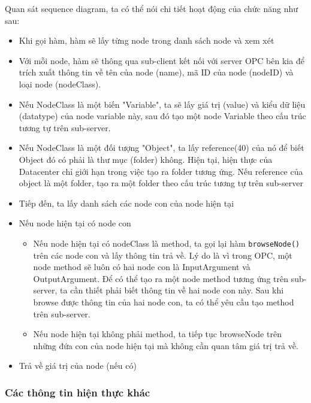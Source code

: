 Quan sát sequence diagram, ta có thể nói chi tiết hoạt động của chức năng như sau:
\begin{itemize}
    \item Khi gọi hàm, hàm sẽ lấy từng node trong danh sách node và xem xét
    \item Với mỗi node, hàm sẽ thông qua sub-client kết nối với server OPC bên kia để trích xuất thông tin về tên của node (name), mã ID của node (nodeID) và loại node (nodeClass).
    \item Nếu NodeClass là một biến "Variable", ta sẽ lấy giá trị (value) và kiểu dữ liệu (datatype) của node variable này, sau đó tạo một node Variable theo cấu trúc tương tự trên sub-server.
    \item Nếu NodeClass là một đối tượng "Object", ta lấy reference(40) của nó để biết Object đó có phải là thư mục (folder) không. Hiện tại, hiện thực của Datacenter chỉ giới hạn trong việc tạo ra folder tương ứng. Nếu reference của object là một folder, tạo ra một folder theo cấu trúc tương tự trên sub-server
    \item Tiếp đến, ta lấy danh sách các node con của node hiện tại
    \item Nếu node hiện tại có node con
    \begin{itemize}
        \item Nếu node hiện tại có nodeClass là method, ta gọi lại hàm \lstinline{browseNode()} trên các node con và lấy thông tin trả về. Lý do là vì trong OPC, một node method sẽ luôn có hai node con là InputArgument và OutputArgument. Để có thể tạo ra một node method tương ứng trên sub-server, ta cần thiết phải biết thông tin về hai node con này. Sau khi browse được thông tin của hai node con, ta có thể yêu cầu tạo method trên sub-server.
        \item Nếu node hiện tại không phải method, ta tiếp tục browseNode trên những đứa con của node hiện tại mà không cần quan tâm giá trị trả về.
    \end{itemize}
    \item Trả về giá trị của node (nếu có)
\end{itemize}

\subsubsection{Các thông tin hiện thực khác}

